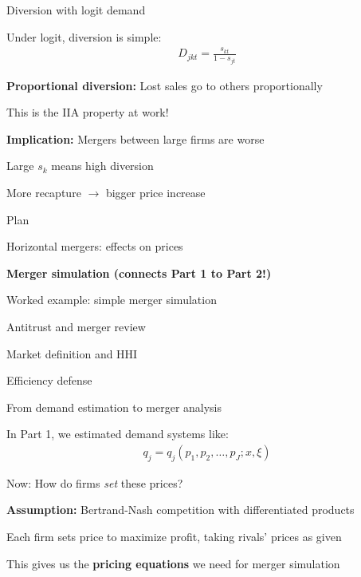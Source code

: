 \documentclass[notes,11pt, aspectratio=169]{beamer}
\newenvironment{wideitemize}{\itemize\addtolength{\itemsep}{10pt}}{\enditemize}
\newenvironment{wideenumerate}{\enumerate\addtolength{\itemsep}{10pt}}{\endenumerate}
\begin{document}
\begin{frame}{Diversion with logit demand}
	\begin{wideitemize}
		\item Under logit, diversion is simple:
		\begin{align*}
			D_{jkt} = \frac{s_{kt}}{1 - s_{jt}}
		\end{align*}
		\item \textbf{Proportional diversion:} Lost sales go to others proportionally
		\item This is the IIA property at work!
		\item \textbf{Implication:} Mergers between large firms are worse
		\begin{wideitemize}
			\vspace{5pt}
			\item Large $s_k$ means high diversion
			\item More recapture $\rightarrow$ bigger price increase
		\end{wideitemize}
	\end{wideitemize}
\end{frame}

\begin{frame}{Plan}
  \begin{wideenumerate}
    \item Horizontal mergers: effects on prices
    \item \textbf{Merger simulation (connects Part 1 to Part 2!)}
    \item Worked example: simple merger simulation
    \item Antitrust and merger review
    \item Market definition and HHI
    \item Efficiency defense
  \end{wideenumerate}
\end{frame}

\begin{frame}{From demand estimation to merger analysis}
	\begin{wideitemize}
		\item In Part 1, we estimated demand systems like:
		\begin{align*}
			q_j = q_j(p_1, p_2, \ldots, p_J; x, \xi)
		\end{align*}
		\item Now: How do firms \textit{set} these prices?
		\item \textbf{Assumption:} Bertrand-Nash competition with differentiated products
		\item Each firm sets price to maximize profit, taking rivals' prices as given
		\item This gives us the \textbf{pricing equations} we need for merger simulation
	\end{wideitemize}
\end{frame}
\end{document}
